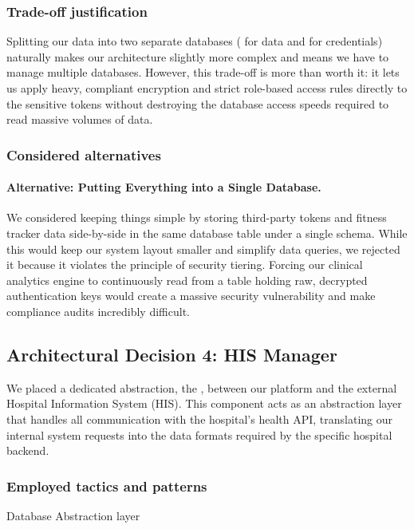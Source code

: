 \subsubsection*{Trade-off justification}
Splitting our data into two separate databases ( for data and  for credentials) naturally makes our architecture slightly more complex and means we have to manage multiple databases. However, this trade-off is more than worth it: it lets us apply heavy, compliant encryption and strict role-based access rules directly to the sensitive tokens without destroying the database access speeds required to read massive volumes of data.

\subsubsection*{Considered alternatives}
\paragraph{Alternative: Putting Everything into a Single Database.}
We considered keeping things simple by storing third-party tokens and fitness tracker data side-by-side in the same database table under a single schema. While this would keep our system layout smaller and simplify data queries, we rejected it because it violates the principle of security tiering. Forcing our clinical analytics engine to continuously read from a table holding raw, decrypted authentication keys would create a massive security vulnerability and make compliance audits incredibly difficult.


\subsection*{Architectural Decision 4:
	HIS Manager}

We placed a dedicated abstraction, the , between our platform and the external Hospital Information System (HIS). This component acts as an abstraction layer that handles all communication with the hospital's health API, translating our internal system requests into the data formats required by the specific hospital backend.

\subsubsection*{Employed tactics and patterns}
Database Abstraction layer


